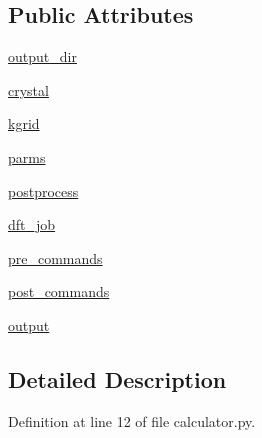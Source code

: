 \subsection*{Public Attributes}
\begin{DoxyCompactItemize}
\item 
\hyperlink{class_d_f_t___k_i_t_1_1core_1_1calculator_1_1calculator_af9be1ce4c811d9ff7146973115d9e254}{output\+\_\+dir}
\item 
\hyperlink{class_d_f_t___k_i_t_1_1core_1_1calculator_1_1calculator_a5e80e925c9765c6d4763fce2d531bfce}{crystal}
\item 
\hyperlink{class_d_f_t___k_i_t_1_1core_1_1calculator_1_1calculator_a6dab8a54556ccbfbdb4f6e6ae9b7e5aa}{kgrid}
\item 
\hyperlink{class_d_f_t___k_i_t_1_1core_1_1calculator_1_1calculator_a19b88dafd31c5ed3dc5fa31922716d74}{parms}
\item 
\hyperlink{class_d_f_t___k_i_t_1_1core_1_1calculator_1_1calculator_a8ae7016b72ab4e047242b2aeb3e5ce68}{postprocess}
\item 
\hyperlink{class_d_f_t___k_i_t_1_1core_1_1calculator_1_1calculator_a4724f290121a7f108b0b00a790ead330}{dft\+\_\+job}
\item 
\hyperlink{class_d_f_t___k_i_t_1_1core_1_1calculator_1_1calculator_aa16b2c67c6adf6c612f76b485292d8a8}{pre\+\_\+commands}
\item 
\hyperlink{class_d_f_t___k_i_t_1_1core_1_1calculator_1_1calculator_a0b83a4e589b749c56e54c5d42e0049d5}{post\+\_\+commands}
\item 
\hyperlink{class_d_f_t___k_i_t_1_1core_1_1calculator_1_1calculator_a52df0fa66d2e031689fa0a1ea9366fe9}{output}
\end{DoxyCompactItemize}


\subsection{Detailed Description}


Definition at line 12 of file calculator.\+py.



